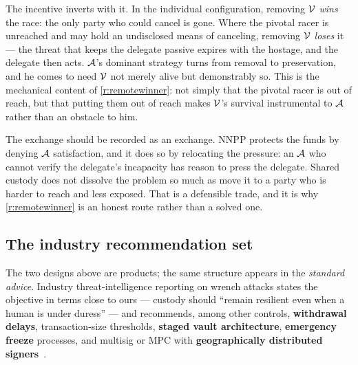 The incentive inverts with it. In the individual configuration, removing $\mathcal{V}$
\emph{wins} the race: the only party who could cancel is gone. Where the pivotal
racer is unreached and may hold an undisclosed means of canceling, removing
$\mathcal{V}$ \emph{loses} it --- the threat that keeps the delegate passive expires
with the hostage, and the delegate then acts. $\mathcal{A}$'s dominant strategy
turns from removal to preservation, and he comes to need $\mathcal{V}$ not merely
alive but demonstrably so. This is the mechanical content of
\ref{r:remotewinner}: not simply that the pivotal racer is out of reach, but that
putting them out of reach makes $\mathcal{V}$'s survival instrumental to $\mathcal{A}$
rather than an obstacle to him.

The exchange should be recorded as an exchange. NNPP protects the funds by
denying $\mathcal{A}$ satisfaction, and it does so by relocating the pressure: an
$\mathcal{A}$ who cannot verify the delegate's incapacity has reason to press the
delegate. Shared custody does not dissolve the problem so much as move it to a
party who is harder to reach and less exposed. That is a defensible trade, and it
is why \ref{r:remotewinner} is an honest route rather than a solved one.

\subsection{The industry recommendation set}
\label{sub:industry}

The two designs above are products; the same structure appears in the
\emph{standard advice}. Industry threat-intelligence reporting on wrench attacks
states the objective in terms close to ours --- custody should ``remain resilient
even when a human is under duress'' --- and recommends, among other controls,
\textbf{withdrawal delays}, transaction-size thresholds, \textbf{staged vault
architecture}, \textbf{emergency freeze} processes, and multisig or MPC with
\textbf{geographically distributed signers}~\cite{certik-intel3d-h1-2026}.

